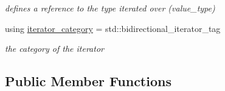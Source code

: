 \begin{DoxyCompactItemize}
\begin{DoxyCompactList}\small\item\em defines a reference to the type iterated over (value\+\_\+type) \end{DoxyCompactList}\item 
using \mbox{\hyperlink{classnlohmann_1_1basic__json_1_1iter__impl_adbe1b700b9cdc38f6991fc68683a9c2c}{iterator\+\_\+category}} = std\+::bidirectional\+\_\+iterator\+\_\+tag
\begin{DoxyCompactList}\small\item\em the category of the iterator \end{DoxyCompactList}\end{DoxyCompactItemize}
\subsection*{Public Member Functions}

